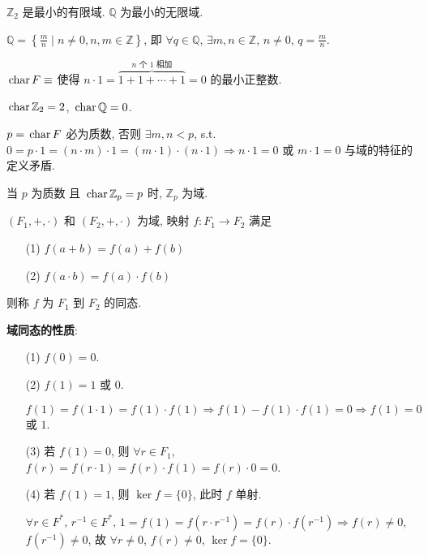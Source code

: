 \documentclass{note}
\begin{document}
\begin{eg}
    $\mathbb{Z}_2$ 是最小的有限域. $\mathbb{Q}$ 为最小的无限域.
\end{eg}

\begin{df}[有理数]
    $\mathbb{Q}=\left\{\frac{m}{n}\mid n\neq 0,n,m\in\mathbb{Z}\right\}$, 即 $\forall q\in\mathbb{Q}$, $\exists m,n\in\mathbb{Z}$, $n\neq 0$, $q=\frac{m}{n}$.
\end{df}

\begin{df}[域的特征]
    $\,\mathrm{char}\, F\equiv$ 使得 $n\cdot 1=\overbrace{1+1+\cdots+1}^{\text{$n$ 个 $1$ 相加}}=0$ 的最小正整数.
\end{df}

\begin{eg}
    $\,\mathrm{char}\,\mathbb{Z}_2=2$, $\,\mathrm{char}\,\mathbb{Q}=0$.
\end{eg}

$p=\,\mathrm{char}\, F$ 必为质数, 否则 $\exists m,n<p$, s.t. $0=p\cdot 1=(n\cdot m)\cdot 1=(m\cdot 1)\cdot(n\cdot 1)\Longrightarrow n\cdot 1=0$ 或 $m\cdot 1=0$ 与域的特征的定义矛盾.

当 $p$ 为质数 且 $\,\mathrm{char}\,\mathbb{Z}_p=p$ 时, $\mathbb{Z}_p$ 为域.

\begin{df}[域同态]
    $(F_1,+,\cdot)$ 和 $(F_2,+,\cdot)$ 为域, 映射 $f:F_1\rightarrow F_2$ 满足
    \begin{itemize}
        \item[(1)] $f(a+b)=f(a)+f(b)$
        \item[(2)] $f(a\cdot b)=f(a)\cdot f(b)$
    \end{itemize}
    则称 $f$ 为 $F_1$ 到 $F_2$ 的同态.
\end{df}

\textbf{域同态的性质}:
\begin{itemize}
    \item[(1)] $f(0)=0$.
    \item[(2)] $f(1)=1$ 或 $0$.
    \begin{pf}
        $f(1)=f(1\cdot 1)=f(1)\cdot f(1)\Longrightarrow f(1)-f(1)\cdot f(1)=0\Longrightarrow f(1)=0$ 或 $1$.
    \end{pf}
    \item[(3)] 若 $f(1)=0$, 则 $\forall r\in F_1$, $f(r)=f(r\cdot 1)=f(r)\cdot f(1)=f(r)\cdot 0=0$.
    \item[(4)] 若 $f(1)=1$, 则 $\ker f=\{0\}$, 此时 $f$ 单射.
    \begin{pf}
        $\forall r\in F^*$, $r^{-1}\in F^*$, $1=f(1)=f(r\cdot r^{-1})=f(r)\cdot f(r^{-1})\Longrightarrow f(r)\neq 0$, $f(r^{-1})\neq 0$, 故 $\forall r\neq 0$, $f(r)\neq 0$, $\ker f=\{0\}$.
    \end{pf}
\end{itemize}
\ifx\allfiles\undefined
\end{document}
